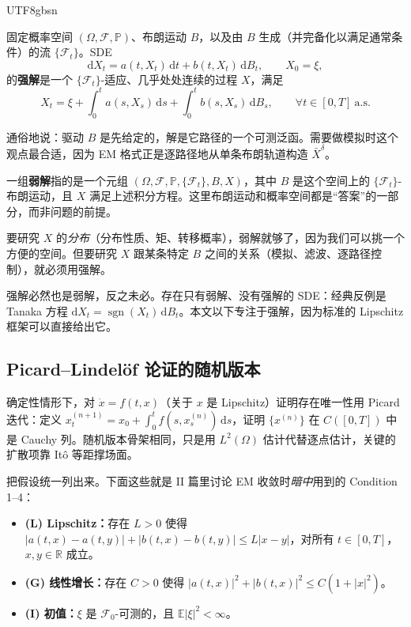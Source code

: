 \documentclass{article}
\theoremstyle{plain}
\theoremstyle{definition}
\begin{document}
\begin{CJK*}{UTF8}{gbsn}
\begin{definition}[强解]
固定概率空间 $(\Omega,\mathcal{F},\mathbb{P})$、布朗运动 $B$，以及由 $B$ 生成（并完备化以满足通常条件）的流 $\{\mathcal{F}_t\}$。SDE
\begin{equation}\label{eq:sde}
    \mathrm{d}X_t=a(t,X_t)\,\mathrm{d}t+b(t,X_t)\,\mathrm{d}B_t,\qquad X_0=\xi,
\end{equation}
的\textbf{强解}是一个 $\{\mathcal{F}_t\}$-适应、几乎处处连续的过程 $X$，满足
\[
  X_t=\xi+\int_0^t a(s,X_s)\,\mathrm{d}s+\int_0^t b(s,X_s)\,\mathrm{d}B_s,\qquad \forall t\in[0,T]\ \text{a.s.}
\]
\end{definition}

通俗地说：驱动 $B$ 是先给定的，解是它路径的一个可测泛函。需要做模拟时这个观点最合适，因为 EM 格式正是逐路径地从单条布朗轨道构造 $\bar{X}^\delta$。

\begin{definition}[弱解]
一组\textbf{弱解}指的是一个元组 $(\Omega,\mathcal{F},\mathbb{P},\{\mathcal{F}_t\},B,X)$，其中 $B$ 是这个空间上的 $\{\mathcal{F}_t\}$-布朗运动，且 $X$ 满足上述积分方程。这里布朗运动和概率空间都是“答案”的一部分，而非问题的前提。
\end{definition}

要研究 $X$ 的\emph{分布}（分布性质、矩、转移概率），弱解就够了，因为我们可以挑一个方便的空间。但要研究 $X$ 跟某条特定 $B$ 之间的关系（模拟、滤波、逐路径控制），就必须用强解。

强解必然也是弱解，反之未必。存在只有弱解、没有强解的 SDE：经典反例是 Tanaka 方程 $\mathrm{d}X_t=\operatorname{sgn}(X_t)\,\mathrm{d}B_t$。本文以下专注于强解，因为标准的 Lipschitz 框架可以直接给出它。

\subsection{Picard--Lindel\"of 论证的随机版本}

确定性情形下，对 $\dot x=f(t,x)$（关于 $x$ 是 Lipschitz）证明存在唯一性用 Picard 迭代：定义 $x^{(n+1)}_t=x_0+\int_0^t f(s,x^{(n)}_s)\,\mathrm{d}s$，证明 $\{x^{(n)}\}$ 在 $C([0,T])$ 中是 Cauchy 列。随机版本骨架相同，只是用 $L^2(\Omega)$ 估计代替逐点估计，关键的扩散项靠 It\^o 等距撑场面。

把假设统一列出来。下面这些就是 II 篇里讨论 EM 收敛时\emph{暗中}用到的 Condition 1--4：

\begin{itemize}
    \item \textbf{(L) Lipschitz：}存在 $L>0$ 使得
    $|a(t,x)-a(t,y)|+|b(t,x)-b(t,y)|\le L|x-y|$，对所有 $t\in[0,T]$，$x,y\in\mathbb{R}$ 成立。
    \item \textbf{(G) 线性增长：}存在 $C>0$ 使得
    $|a(t,x)|^2+|b(t,x)|^2\le C(1+|x|^2)$。
    \item \textbf{(I) 初值：}$\xi$ 是 $\mathcal{F}_0$-可测的，且 $\mathbb{E}|\xi|^2<\infty$。
\end{itemize}


\end{CJK*}
\end{document}
